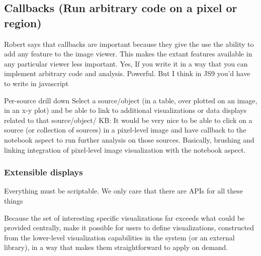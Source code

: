\subsection{Callbacks (Run arbitrary code on a pixel or region)}

Robert says that callbacks are important because they give the use the ability to add any feature to the image viewer. This makes the extant features available in any particular viewer less important.
Yes, If you write it in a way that you can implement arbitrary code and analysis.  Powerful. But I think in JS9 you'd have to write in javascript

Per-source drill down
Select a source/object (in a table, over plotted on an image, in an x-y plot) and be able to link to additional visualizations or data displays related to that source/object/
KB: It would be very nice to be able to click on a source (or collection of sources) in a pixel-level image and have callback to the notebook aspect to run further analysis on those sources. Basically, brushing and linking integration of pixel-level image visualization with the notebook aspect.


\subsubsection{Extensible displays}
Everything must be scriptable.
We only care that there are APIs for all these things

Because the set of interesting specific visualizations far exceeds what could be provided centrally, make it possible for users to define visualizations, constructed from the lower-level visualization capabilities in the system (or an external library), in a way that makes them straightforward to apply on demand.

